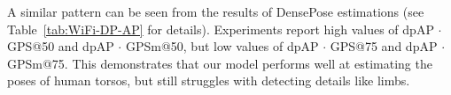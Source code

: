 \documentclass[sigconf, anonymous=false]{acmart}
\newcommand{\fer}[1]{\textcolor{blue}{[Fernando: #1]}}
\begin{document}
A similar pattern can be seen from the results of DensePose estimations (see Table~\ref{tab:WiFi-DP-AP} for details). Experiments report high values of dpAP $\cdot$ GPS@50 and dpAP $\cdot$ GPSm@50, but low values of dpAP $\cdot$ GPS@75 and dpAP $\cdot$ GPSm@75. This demonstrates that our model performs well at estimating the poses of human torsos, but still struggles with detecting details like limbs.







\end{document}
